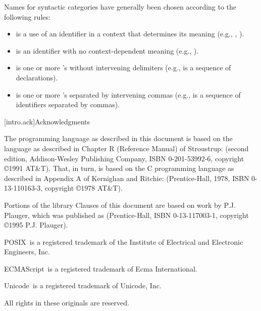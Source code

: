 \pnum
Names for syntactic categories have generally been chosen according to
the following rules:
\begin{itemize}
\item {} is a use of an identifier in a context that
determines its meaning (e.g., ,
).
\item {} is an identifier with no context-dependent meaning
(e.g., ).
\item {} is one or more 's without intervening
delimiters (e.g.,  is a sequence of
declarations).
\item {} is one or more 's separated by
intervening commas (e.g.,  is a sequence of
identifiers separated by commas).
\end{itemize}%

[intro.ack]{Acknowledgments}

\pnum
The \Cpp{}  programming language as described in this document
is based on the language as described in Chapter R (Reference
Manual) of Stroustrup:  (second
edition, Addison-Wesley Publishing Company, ISBN 0-201-53992-6,
copyright \copyright 1991 AT\&T). That, in turn, is based on the C
programming language as described in Appendix A of Kernighan and
Ritchie:  (Prentice-Hall, 1978, ISBN
0-13-110163-3, copyright \copyright 1978 AT\&T).

\pnum
Portions of the library Clauses of this document are based
on work by P.J. Plauger, which was published as  (Prentice-Hall, ISBN 0-13-117003-1, copyright
\copyright 1995 P.J. Plauger).

\pnum
POSIX\textregistered\ is a registered trademark of the Institute of Electrical and
Electronic Engineers, Inc.

\pnum
ECMAScript\textregistered\ is a registered trademark of Ecma International.

\pnum
Unicode\textregistered\ is a registered trademark of Unicode, Inc.

\pnum
All rights in these originals are reserved.
